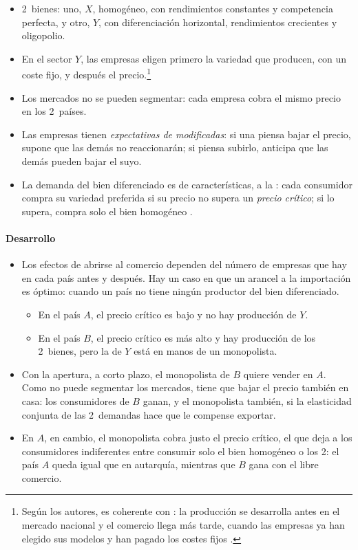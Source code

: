 \documentclass[11pt]{article}
\begin{document}
\begin{itemize}
\item 2~bienes: uno, $X$, homogéneo, con rendimientos constantes y competencia perfecta, y otro, $Y$, con diferenciación horizontal, rendimientos crecientes y oligopolio.
\item En el sector $Y$, las empresas eligen primero la variedad que producen, con un coste fijo, y después el precio.\footnote{Según los autores, es coherente con \textcite{Linder1961Essay}: la producción se desarrolla antes en el mercado nacional y el comercio llega más tarde, cuando las empresas ya han elegido sus modelos y han pagado los costes fijos .}
\item Los mercados no se pueden segmentar: cada empresa cobra el mismo precio en los 2~países.
\item Las empresas tienen \emph{expectativas de  modificadas}: si una piensa bajar el precio, supone que las demás no reaccionarán; si piensa subirlo, anticipa que las demás pueden bajar el suyo.
\item La demanda del bien diferenciado es de características, a la : cada consumidor compra su variedad preferida si su precio no supera un \emph{precio crítico}; si lo supera, compra solo el bien homogéneo .
\end{itemize}

\paragraph{Desarrollo}

\begin{itemize}
\item Los efectos de abrirse al comercio dependen del número de empresas que hay en cada país antes y después. Hay un caso en que un arancel a la importación es óptimo: cuando un país no tiene ningún productor del bien diferenciado.
  \begin{itemize}
  \item En el país $A$, el precio crítico es bajo y no hay producción de $Y$.
  \item En el país $B$, el precio crítico es más alto y hay producción de los 2~bienes, pero la de $Y$ está en manos de un monopolista.
  \end{itemize}
\item Con la apertura, a corto plazo, el monopolista de $B$ quiere vender en $A$. Como no puede segmentar los mercados, tiene que bajar el precio también en casa: los consumidores de $B$ ganan, y el monopolista también, si la elasticidad conjunta de las 2~demandas hace que le compense exportar.
\item En $A$, en cambio, el monopolista cobra justo el precio crítico, el que deja a los consumidores indiferentes entre consumir solo el bien homogéneo o los 2: el país $A$ queda igual que en autarquía, mientras que $B$ gana con el libre comercio.
\end{itemize}
\end{document}
